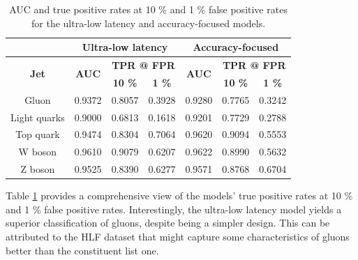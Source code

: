 \begin{table}[!hpt]
  \centering
  \caption{AUC and true positive rates at 10 \% and 1 \% false positive rates for the ultra-low latency and accuracy-focused models.}
  \label{tab:AUCs}
  \bgroup
  \def\arraystretch{1.2}
  \setlength\tabcolsep{2.5mm}
  \begin{tabular}{c|ccc|ccc|}
  \cline{2-7}
  \multicolumn{1}{l|}{} & \multicolumn{3}{c|}{\textbf{Ultra-low latency}} & \multicolumn{3}{c|}{\textbf{Accuracy-focused}} \\ \hline
  \multicolumn{1}{|c|}{\multirow{2}{*}{\textbf{Jet}}} & \multicolumn{1}{c|}{\multirow{2}{*}{\textbf{AUC}}} & \multicolumn{2}{c|}{\textbf{TPR @ FPR}} & \multicolumn{1}{c|}{\multirow{2}{*}{\textbf{AUC}}} & \multicolumn{2}{c|}{\textbf{TPR @ FPR}} \\ \cline{3-4} \cline{6-7} 
  \multicolumn{1}{|c|}{} & \multicolumn{1}{c|}{} & \multicolumn{1}{c|}{\textbf{10 \%}} & \textbf{1 \%} & \multicolumn{1}{c|}{} & \multicolumn{1}{c|}{\textbf{10 \%}} & \textbf{1 \%} \\ \hline \hline
  \multicolumn{1}{|c|}{Gluon} & \multicolumn{1}{c|}{0.9372} & \multicolumn{1}{c|}{0.8057} & 0.3928 & \multicolumn{1}{c|}{0.9280} & \multicolumn{1}{c|}{0.7765} & 0.3242 \\ \hline
  \multicolumn{1}{|c|}{Light quarks} & \multicolumn{1}{c|}{0.9000} & \multicolumn{1}{c|}{0.6813} & 0.1618 & \multicolumn{1}{c|}{0.9201} & \multicolumn{1}{c|}{0.7729} & 0.2788 \\ \hline
  \multicolumn{1}{|c|}{Top quark} & \multicolumn{1}{c|}{0.9474} & \multicolumn{1}{c|}{0.8304} & 0.7064 & \multicolumn{1}{c|}{0.9620} & \multicolumn{1}{c|}{0.9094} & 0.5553 \\ \hline
  \multicolumn{1}{|c|}{W boson} & \multicolumn{1}{c|}{0.9610} & \multicolumn{1}{c|}{0.9079} & 0.6207 & \multicolumn{1}{c|}{0.9622} & \multicolumn{1}{c|}{0.8990} & 0.5632 \\ \hline
  \multicolumn{1}{|c|}{Z boson} & \multicolumn{1}{c|}{0.9525} & \multicolumn{1}{c|}{0.8390} & 0.6277 & \multicolumn{1}{c|}{0.9571} & \multicolumn{1}{c|}{0.8768} & 0.6704 \\ \hline
  \end{tabular}
  \egroup
\end{table}

Table \ref{tab:AUCs} provides a comprehensive view of the models' true positive rates at 10 \% and 1 \% false positive rates. Interestingly, the ultra-low latency model yields a superior classification of gluons, despite being a simpler design. This can be attributed to the HLF dataset that might capture some characteristics of gluons better than the constituent list one.


